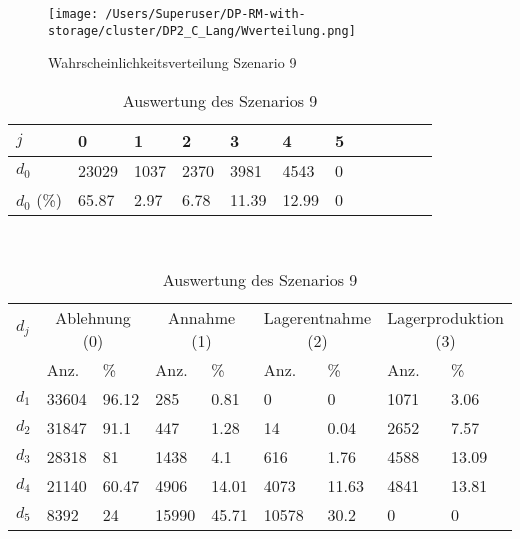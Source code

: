 \begin{figure}[h!]
  \begin{center}
    \texttt{[image: /Users/Superuser/DP-RM-with-storage/cluster/DP2\_C\_Lang/Wverteilung.png]}
    \caption{Wahrscheinlichkeitsverteilung Szenario 9}  \label{SB9}
  \end{center}
\end{figure}

\begin{table}[h!]
\renewcommand{\arraystretch}{1.5}
  \begin{center}
    \caption{Auswertung des Szenarios 9}  \label{AS9}
    \vspace*{3mm}
    \begin{tabular}{l l l l l l l l l l l l }  \hline 
         $j$ & 0 & 1  & 2 & 3 & 4  & 5   \\  \hline
$d_{0}$ &  23029 &  1037 &  2370 &   3981 &   4543 &  0 \\
$d_{0}$ (\%) &  65.87 &  2.97 &  6.78 &  11.39 &  12.99 &  0 \\
\hline
    \end{tabular} \\[3mm]
        \begin{tabular}{ l l l l l l l l l}   \hline    %
    $d_j$ & \multicolumn{2}{c}{Ablehnung (0)} & \multicolumn{2}{c}{Annahme (1)}  & \multicolumn{2}{c}{Lagerentnahme (2)} & \multicolumn{2}{c}{Lagerproduktion (3)}\\
    & Anz. & \% & Anz. & \% & Anz. & \% & Anz. & \% \\ \hline 
$d_{1}$ &  33604 &  96.12 &    285 &   0.81 &    0 &    0 &  1071 &   3.06 \\
$d_{2}$ &  31847 &   91.1 &    447 &   1.28 &     14 &   0.04 &  2652 &   7.57 \\
$d_{3}$ &  28318 &     81 &   1438 &    4.1 &    616 &   1.76 &  4588 &  13.09 \\
$d_{4}$ &  21140 &  60.47 &   4906 &  14.01 &   4073 &  11.63 &  4841 &  13.81 \\
$d_{5}$ &   8392 &     24 &  15990 &  45.71 &  10578 &   30.2 &   0 &    0 \\
          \hline
   \end{tabular} \\[3mm]
     \end{center}
\end{table}

